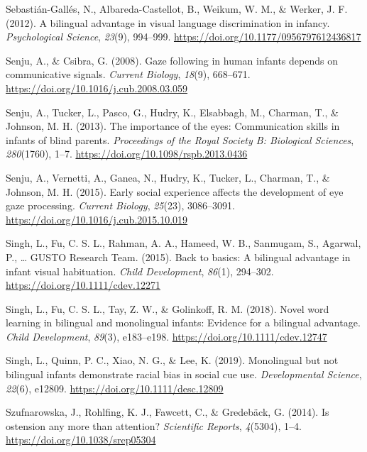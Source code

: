 \documentclass[
  english,
  ,man,floatsintext]{apa6}
\begin{document}
\leavevmode\hypertarget{ref-Sebastian-Galles_etal_2012}{}%
Sebastián-Gallés, N., Albareda-Castellot, B., Weikum, W. M., \& Werker, J. F. (2012). A bilingual advantage in visual language discrimination in infancy. \emph{Psychological Science}, \emph{23}(9), 994--999. \url{https://doi.org/10.1177/0956797612436817}

\leavevmode\hypertarget{ref-Senju_Csibra_2008}{}%
Senju, A., \& Csibra, G. (2008). Gaze following in human infants depends on communicative signals. \emph{Current Biology}, \emph{18}(9), 668--671. \url{https://doi.org/10.1016/j.cub.2008.03.059}

\leavevmode\hypertarget{ref-Senju_etal_2013}{}%
Senju, A., Tucker, L., Pasco, G., Hudry, K., Elsabbagh, M., Charman, T., \& Johnson, M. H. (2013). The importance of the eyes: Communication skills in infants of blind parents. \emph{Proceedings of the Royal Society B: Biological Sciences}, \emph{280}(1760), 1--7. \url{https://doi.org/10.1098/rspb.2013.0436}

\leavevmode\hypertarget{ref-Senju_etal_2015}{}%
Senju, A., Vernetti, A., Ganea, N., Hudry, K., Tucker, L., Charman, T., \& Johnson, M. H. (2015). Early social experience affects the development of eye gaze processing. \emph{Current Biology}, \emph{25}(23), 3086--3091. \url{https://doi.org/10.1016/j.cub.2015.10.019}

\leavevmode\hypertarget{ref-Singh_etal_2015}{}%
Singh, L., Fu, C. S. L., Rahman, A. A., Hameed, W. B., Sanmugam, S., Agarwal, P., \ldots{} GUSTO Research Team. (2015). Back to basics: A bilingual advantage in infant visual habituation. \emph{Child Development}, \emph{86}(1), 294--302. \url{https://doi.org/10.1111/cdev.12271}

\leavevmode\hypertarget{ref-Singh_etal_2018}{}%
Singh, L., Fu, C. S. L., Tay, Z. W., \& Golinkoff, R. M. (2018). Novel word learning in bilingual and monolingual infants: Evidence for a bilingual advantage. \emph{Child Development}, \emph{89}(3), e183--e198. \url{https://doi.org/10.1111/cdev.12747}

\leavevmode\hypertarget{ref-Singh_etal_2019}{}%
Singh, L., Quinn, P. C., Xiao, N. G., \& Lee, K. (2019). Monolingual but not bilingual infants demonstrate racial bias in social cue use. \emph{Developmental Science}, \emph{22}(6), e12809. \url{https://doi.org/10.1111/desc.12809}

\leavevmode\hypertarget{ref-Szufnarowska_etal_2014}{}%
Szufnarowska, J., Rohlfing, K. J., Fawcett, C., \& Gredebäck, G. (2014). Is ostension any more than attention? \emph{Scientific Reports}, \emph{4}(5304), 1--4. \url{https://doi.org/10.1038/srep05304}
\end{document}

